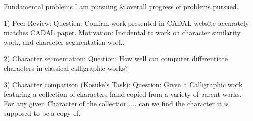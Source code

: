 Fundamental problems I am pursuing & overall progress of problems pursued.



1)  Peer-Review:
    Question:  Confirm work presented in CADAL website accurately matches CADAL paper.
    Motivation:  Incidental to work on character similarity work, and character segmentation work.



2)  Character segmentation:
    Question:  How well can computer differentiate characters in classical calligraphic works?


3)  Character comparison (Kosuke's Task):
    Question:   Given a Calligraphic work featuring a collection of characters hand-copied from a variety of parent works.
                For any given Character of the collection,.... can we find the character it is supposed to be a copy of.
